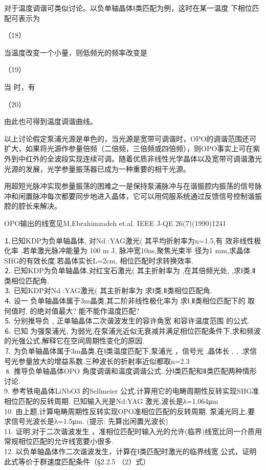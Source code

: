  
对于温度调谐可类似讨论。以负单轴晶体Ⅰ类匹配为例，这时在某一温度 下相位匹配可表示为
                                  
（18）

当温度改变一个小量，则低频光的频率改变是

            （19）

当 时，有

                       （20）        

由此也可得到温度调谐曲线。

以上讨论假定泵浦光源是单色的，当光源是宽带可调谐时，OPO的调谐范围还可扩大，如果将光源作参量倍频（二倍频，三倍频或四倍频），则OPO事实上可在紫外到中红外的全波段实现连续可调。随着优质非线性光学晶体以及宽带可调谐激光光源的发展，光学参量振荡器已成为一种重要的相干光源。

用超短光脉冲实现参量振荡的困难之一是保持泵浦脉冲与在谐振腔内振荡的信号脉冲和闲置脉冲每次都要同步地进入晶体，它可以用伺服系统通过反馈信号控制谐振腔的腔长来解决。

OPO输出的线宽见M,Ebrahimzadeh et.al. IEEE J-QE 26(7)(1990)1241

\begin{exercise}
    
   ⒈已知KDP为负单轴晶体, 对Nd :YAG激光( 其平均折射率为n=1.5,有
   效非线性极化率 ,若单激光脉冲能量为 100 m J, 脉冲宽10ns,聚焦光束半
   径为1 mm,求晶体SHG的有效长度.若晶体实长L=2cm, 相位匹配时求转换效率.\\
      ⒉  已知KDP为负单轴晶体,对红宝石激光( 其主折射率为 ,在其倍频光处, ,求Ⅰ类,Ⅱ类相位匹配角.\\
       ⒊ 已知KDP对Nd :YAG激光( 其主折射率为 求Ⅰ类,Ⅱ类相位匹配角.\\
   ⒋  设一 负单轴晶体属于3m晶类,其二阶非线性极化率为 
   求Ⅰ,Ⅱ类相位匹配下的 取何值时, 的绝对值最大?  能不能作温度匹配?\\
      ⒌ 分别推导负﹑正单轴晶体二次谐波发生的容许角宽 和容许温度范围 的公式.\\ 
      ⒍  已知 为强泵浦光,  为弱光,在泵浦光近似无衰减并满足相位匹配条件下,求和频波的光强公式,解释它在空间周期性变化的原因.\\
      ⒎   为负单轴晶体属于3m晶类,在Ⅰ类温度匹配下,泵浦光 ，信号光 ,晶体长 ,   , .求信号光参量放大的增益系数.三种波长的折射率近似都取n=2.3\\
      ⒏ 推导负单轴晶体OPO 角度调谐和温度调谐公式..分Ⅰ类匹配和Ⅱ类匹配两种情形讨论.\\
      9. 参考铁电晶体LiNbO3 的Sellmeier 公式,计算用它的电畴周期性反转实现SHG准相位匹配的反转周期. 已知输入光是Nd:YAG 激光,波长是λ=1.064μm\\
      10. 由上题,计算电畴周期性反转实现OPO准相位匹配的反转周期. 泵浦光同上,要求信号光波长是λ=1.5μm. (提示: 先算出闲置光波长)\\
      11. 证明,对于二次谐波发生 ，准相位匹配时输入光的允许(临界)线宽比同一介质用常规相位匹配的允许线宽要小很多.\\
      12. 以负单轴晶体作二次谐波发生，计算在Ⅰ类匹配时激光的临界线宽 公式，证明此式等价于群速度匹配条件（§2.2.5 （2）式）\\
\end{exercise}

